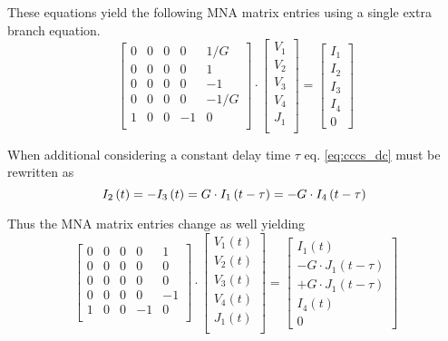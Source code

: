 These equations yield the following MNA matrix entries using a single
extra branch equation.
\begin{equation}
\begin{bmatrix}
0 & 0 & 0 & 0 & 1/G\\
0 & 0 & 0 & 0 & 1\\
0 & 0 & 0 & 0 & -1\\
0 & 0 & 0 & 0 & -1/G\\
1 & 0 & 0 & -1 & 0\\
\end{bmatrix}
\cdot
\begin{bmatrix}
V_1\\
V_2\\
V_3\\
V_4\\
J_1\\
\end{bmatrix}
=
\begin{bmatrix}
I_1\\
I_2\\
I_3\\
I_4\\
0
\end{bmatrix}
\end{equation}

When additional considering a constant delay time $\tau$
eq. \eqref{eq:cccs_dc} must be rewritten as
\begin{equation}
\label{eq:cccs_delay}
I_2\left(t\right) = -I_3\left(t\right) = G\cdot I_1\left(t -\tau\right) = -G\cdot I_4\left(t -\tau\right)\\
\end{equation}

Thus the MNA matrix entries change as well yielding
\begin{equation}
\begin{bmatrix}
0 & 0 & 0 & 0 & 1\\
0 & 0 & 0 & 0 & 0\\
0 & 0 & 0 & 0 & 0\\
0 & 0 & 0 & 0 & -1\\
1 & 0 & 0 & -1 & 0\\
\end{bmatrix}
\cdot
\begin{bmatrix}
V_1\left(t\right)\\
V_2\left(t\right)\\
V_3\left(t\right)\\
V_4\left(t\right)\\
J_1\left(t\right)\\
\end{bmatrix}
=
\begin{bmatrix}
I_1\left(t\right)\\
-G\cdot J_1\left(t -\tau\right)\\
+G\cdot J_1\left(t -\tau\right)\\
I_4\left(t\right)\\
0
\end{bmatrix}
\end{equation}

